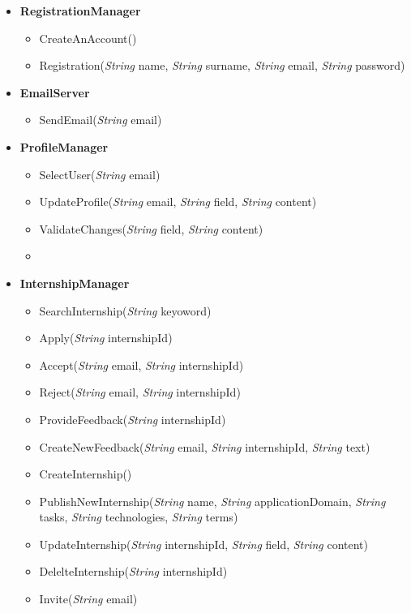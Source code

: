 \begin{itemize}
    \item \textbf{\textbf{RegistrationManager}}
\begin{itemize}
        \item CreateAnAccount()
        \item Registration(\textit{String} name, \textit{String} surname, \textit{String} email, \textit{String} password)
\end{itemize}

    \item \textbf{\textbf{EmailServer}}
\begin{itemize}
        \item SendEmail(\textit{String} email)
\end{itemize}

    \item \textbf{\textbf{ProfileManager}}
\begin{itemize}
        \item SelectUser(\textit{String} email)
        \item UpdateProfile(\textit{String} email, \textit{String} field, \textit{String} content)
        \item ValidateChanges(\textit{String} field, \textit{String} content)
        \item 
\end{itemize}

    \item \textbf{\textbf{InternshipManager}}
\begin{itemize}



    \item SearchInternship(\textit{String} keyoword)
    \item Apply(\textit{String} internshipId)
    \item Accept(\textit{String} email, \textit{String} internshipId)
    \item Reject(\textit{String} email, \textit{String} internshipId)
    \item ProvideFeedback(\textit{String} internshipId)
    \item CreateNewFeedback(\textit{String} email, \textit{String} internshipId, \textit{String} text)
    \item CreateInternship()
    \item PublishNewInternship(\textit{String} name, \textit{String} applicationDomain, \textit{String} tasks, \textit{String} technologies, \textit{String}  terms)
    \item UpdateInternship(\textit{String} internshipId, \textit{String} field, \textit{String} content)
    \item DelelteInternship(\textit{String} internshipId)
    \item Invite(\textit{String} email)
\end{itemize}


\end{itemize}
